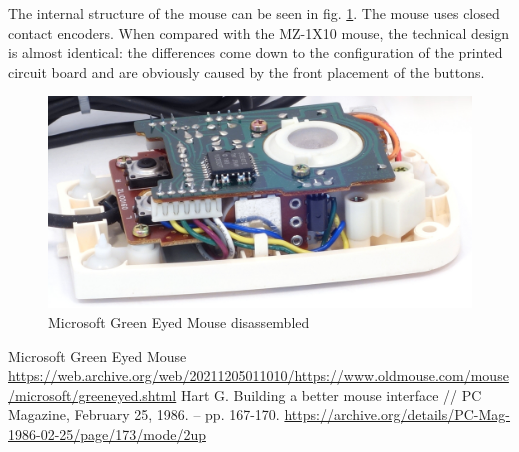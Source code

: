 \documentclass[11pt, a4paper]{article}
\begin{document}
The internal structure of the mouse can be seen in fig. \ref{fig:MicrosoftGreenEyedInside}. The mouse uses closed contact encoders. When compared with the MZ-1X10 mouse, the technical design is almost identical: the differences come down to the configuration of the printed circuit board and are obviously caused by the front placement of the buttons.

 \begin{figure}[h]
    \centering
    \includegraphics[scale=1]{1983_microsoft_green_eyed_mouse/inside_30.jpg}
    \caption{Microsoft Green Eyed Mouse disassembled}
    \label{fig:MicrosoftGreenEyedInside}
\end{figure}

\begin{thebibliography}{9}
 Microsoft Green Eyed Mouse \url{https://web.archive.org/web/20211205011010/https://www.oldmouse.com/mouse/microsoft/greeneyed.shtml}
 Hart G. Building a better mouse interface // PC Magazine, February 25, 1986. -- pp. 167-170. \url{https://archive.org/details/PC-Mag-1986-02-25/page/173/mode/2up}
\end{thebibliography}
\end{document}
